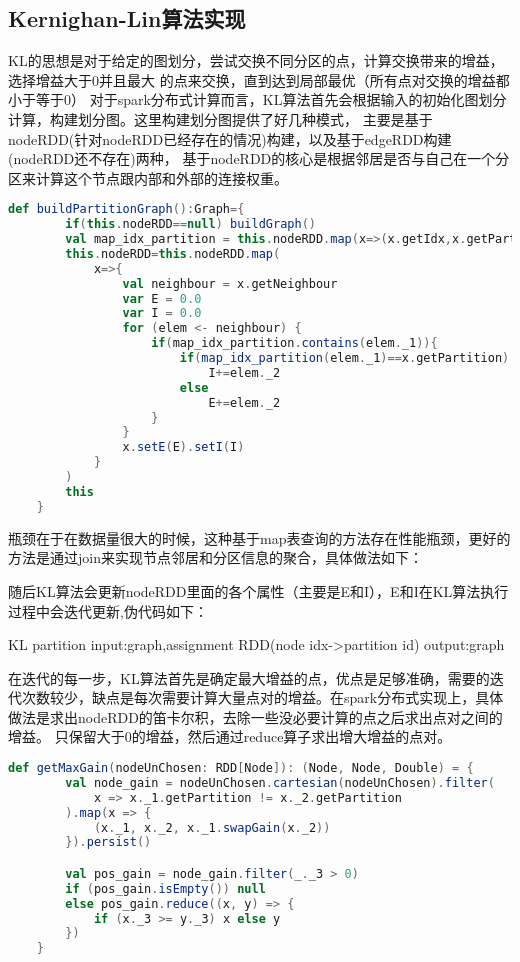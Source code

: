 \subsection{Kernighan-Lin算法实现}

KL的思想是对于给定的图划分，尝试交换不同分区的点，计算交换带来的增益，选择增益大于0并且最大
的点来交换，直到达到局部最优（所有点对交换的增益都小于等于0）
对于spark分布式计算而言，KL算法首先会根据输入的初始化图划分计算，构建划分图。这里构建划分图提供了好几种模式，
主要是基于nodeRDD(针对nodeRDD已经存在的情况)构建，以及基于edgeRDD构建(nodeRDD还不存在)两种，
基于nodeRDD的核心是根据邻居是否与自己在一个分区来计算这个节点跟内部和外部的连接权重。


\begin{lstlisting}[language=Scala]
def buildPartitionGraph():Graph={
        if(this.nodeRDD==null) buildGraph()
        val map_idx_partition = this.nodeRDD.map(x=>(x.getIdx,x.getPartition)).collectAsMap()
        this.nodeRDD=this.nodeRDD.map(
            x=>{
                val neighbour = x.getNeighbour
                var E = 0.0
                var I = 0.0
                for (elem <- neighbour) {
                    if(map_idx_partition.contains(elem._1)){
                        if(map_idx_partition(elem._1)==x.getPartition)
                            I+=elem._2
                        else
                            E+=elem._2
                    }
                }
                x.setE(E).setI(I)
            }
        )
        this
    }
\end{lstlisting}

瓶颈在于在数据量很大的时候，这种基于map表查询的方法存在性能瓶颈，更好的方法是通过join来实现节点邻居和分区信息的聚合，具体做法如下：

随后KL算法会更新nodeRDD里面的各个属性（主要是E和I），E和I在KL算法执行过程中会迭代更新,伪代码如下：

KL partition
input:graph,assignment RDD(node idx->partition id)
output:graph


在迭代的每一步，KL算法首先是确定最大增益的点，优点是足够准确，需要的迭代次数较少，缺点是每次需要计算大量点对的增益。在spark分布式实现上，具体做法是求出nodeRDD的笛卡尔积，去除一些没必要计算的点之后求出点对之间的增益。
只保留大于0的增益，然后通过reduce算子求出增大增益的点对。
\begin{lstlisting}[language=Scala]
def getMaxGain(nodeUnChosen: RDD[Node]): (Node, Node, Double) = {
        val node_gain = nodeUnChosen.cartesian(nodeUnChosen).filter(
            x => x._1.getPartition != x._2.getPartition
        ).map(x => {
            (x._1, x._2, x._1.swapGain(x._2))
        }).persist()

        val pos_gain = node_gain.filter(_._3 > 0)
        if (pos_gain.isEmpty()) null
        else pos_gain.reduce((x, y) => {
            if (x._3 >= y._3) x else y
        })
    }
\end{lstlisting}


